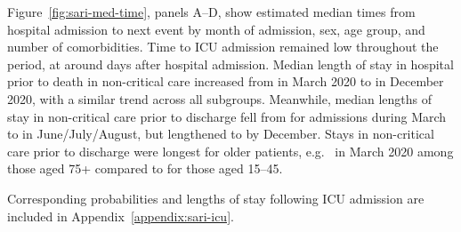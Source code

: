 Figure~\ref{fig:sari-med-time}, panels A--D, show estimated median times from hospital admission to next event by month of admission, sex, age group, and number of comorbidities. Time to ICU admission remained low throughout the period, at around  days after hospital admission. Median length of stay in hospital prior to death in non-critical care increased from  in March 2020 to  in December 2020, with a similar trend across all subgroups. Meanwhile, median lengths of stay in non-critical care prior to discharge fell from  for admissions during March to  in June/July/August, but lengthened to  by December. Stays in non-critical care prior to discharge were longest for older patients, e.g.\  in March 2020 among those aged 75+ compared to  for those aged 15--45.

Corresponding probabilities and lengths of stay following ICU admission are included in Appendix~\ref{appendix:sari-icu}.

